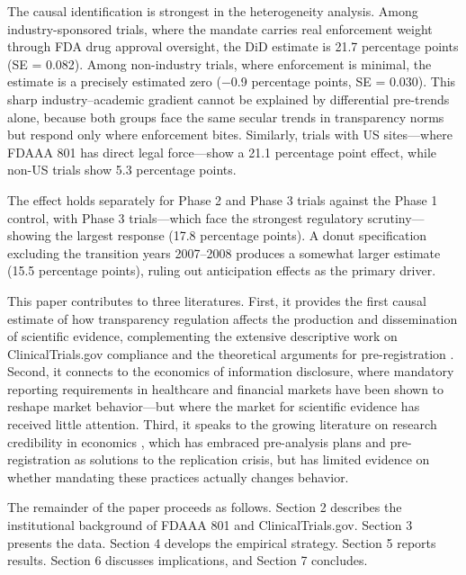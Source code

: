 \documentclass[12pt]{article}
\begin{document}
The causal identification is strongest in the heterogeneity analysis. Among industry-sponsored trials, where the mandate carries real enforcement weight through FDA drug approval oversight, the DiD estimate is 21.7 percentage points (SE = 0.082). Among non-industry trials, where enforcement is minimal, the estimate is a precisely estimated zero ($-$0.9 percentage points, SE = 0.030). This sharp industry--academic gradient cannot be explained by differential pre-trends alone, because both groups face the same secular trends in transparency norms but respond only where enforcement bites. Similarly, trials with US sites---where FDAAA 801 has direct legal force---show a 21.1 percentage point effect, while non-US trials show 5.3 percentage points.

The effect holds separately for Phase 2 and Phase 3 trials against the Phase 1 control, with Phase 3 trials---which face the strongest regulatory scrutiny---showing the largest response (17.8 percentage points). A donut specification excluding the transition years 2007--2008 produces a somewhat larger estimate (15.5 percentage points), ruling out anticipation effects as the primary driver.

This paper contributes to three literatures. First, it provides the first causal estimate of how transparency regulation affects the production and dissemination of scientific evidence, complementing the extensive descriptive work on ClinicalTrials.gov compliance \citep{prayle2012compliance, anderson2015compliance, devito2020trends} and the theoretical arguments for pre-registration \citep{olken2015promises, nosek2015promoting}. Second, it connects to the economics of information disclosure, where mandatory reporting requirements in healthcare \citep{dranove2003is, jin2005effect} and financial markets have been shown to reshape market behavior---but where the market for scientific evidence has received little attention. Third, it speaks to the growing literature on research credibility in economics \citep{brodeur2020methods, andrews2019identification, christensen2019transparency}, which has embraced pre-analysis plans \citep{casey2012reshaping} and pre-registration \citep{miguel2014promoting} as solutions to the replication crisis, but has limited evidence on whether mandating these practices actually changes behavior.

The remainder of the paper proceeds as follows. Section 2 describes the institutional background of FDAAA 801 and ClinicalTrials.gov. Section 3 presents the data. Section 4 develops the empirical strategy. Section 5 reports results. Section 6 discusses implications, and Section 7 concludes.
\end{document}
